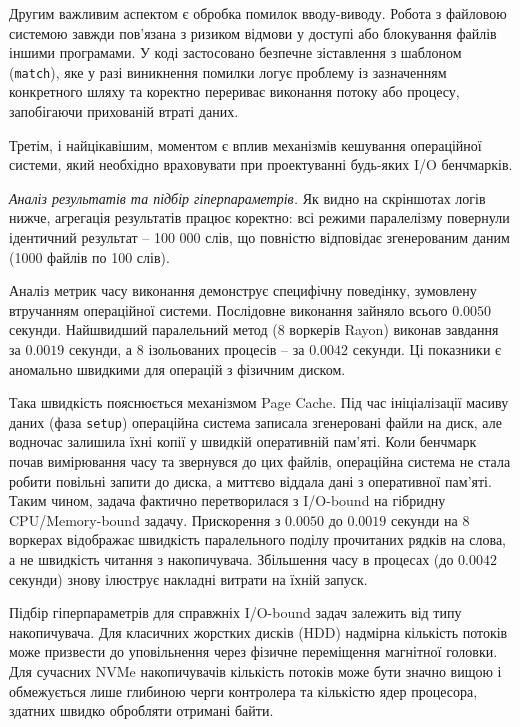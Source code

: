 \documentclass[14pt, a4paper]{extreport}
\begin{document}
	Другим важливим аспектом є обробка помилок вводу-виводу. Робота з файловою системою завжди пов'язана з ризиком відмови у доступі або блокування файлів іншими програмами. У коді застосовано безпечне зіставлення з шаблоном (\texttt{match}), яке у разі виникнення помилки логує проблему із зазначенням конкретного шляху та коректно перериває виконання потоку або процесу, запобігаючи прихованій втраті даних.
	
	Третім, і найцікавішим, моментом є вплив механізмів кешування операційної системи, який необхідно враховувати при проектуванні будь-яких I/O бенчмарків.
	
	\textit{Аналіз результатів та підбір гіперпараметрів.}
	Як видно на скріншотах логів нижче, агрегація результатів працює коректно: всі режими паралелізму повернули ідентичний результат -- 100 000 слів, що повністю відповідає згенерованим даним (1000 файлів по 100 слів). 
	
	
	Аналіз метрик часу виконання демонструє специфічну поведінку, зумовлену втручанням операційної системи. Послідовне виконання зайняло всього $0.0050$ секунди. Найшвидший паралельний метод (8 воркерів Rayon) виконав завдання за $0.0019$ секунди, а 8 ізольованих процесів -- за $0.0042$ секунди. Ці показники є аномально швидкими для операцій з фізичним диском.
	
	Така швидкість пояснюється механізмом Page Cache. Під час ініціалізації масиву даних (фаза \texttt{setup}) операційна система записала згенеровані файли на диск, але водночас залишила їхні копії у швидкій оперативній пам'яті. Коли бенчмарк почав вимірювання часу та звернувся до цих файлів, операційна система не стала робити повільні запити до диска, а миттєво віддала дані з оперативної пам'яті. Таким чином, задача фактично перетворилася з I/O-bound на гібридну CPU/Memory-bound задачу. Прискорення з $0.0050$ до $0.0019$ секунди на 8 воркерах відображає швидкість паралельного поділу прочитаних рядків на слова, а не швидкість читання з накопичувача. Збільшення часу в процесах (до $0.0042$ секунди) знову ілюструє накладні витрати на їхній запуск.
	
	
	Підбір гіперпараметрів для справжніх I/O-bound задач залежить від типу накопичувача. Для класичних жорстких дисків (HDD) надмірна кількість потоків може призвести до уповільнення через фізичне переміщення магнітної головки. Для сучасних NVMe накопичувачів кількість потоків може бути значно вищою і обмежується лише глибиною черги контролера та кількістю ядер процесора, здатних швидко обробляти отримані байти.
	
\end{document}
